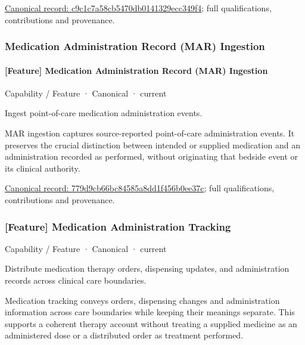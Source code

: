 {\footnotesize \href{../../../../continuum/strategy/capability/feature/c9c1c7a58cb5470db0141329ecc349f4.md}{Canonical record: c9c1c7a58cb5470db0141329ecc349f4}; full qualifications, contributions and provenance.}\par
\subsubsection{Medication Administration Record (MAR) Ingestion}

\paragraph{[Feature] Medication Administration Record (MAR) Ingestion}

\label{element:779d9cb66bc84585a8dd1f456b0ee37c}
{\small Capability / Feature · Canonical · current}\par

Ingest point-of-care medication administration events.



MAR ingestion captures source-reported point-of-care administration events. It preserves the crucial distinction between intended or supplied medication and an administration recorded as performed, without originating that bedside event or its clinical authority.


{\footnotesize \href{../../../../continuum/strategy/capability/feature/779d9cb66bc84585a8dd1f456b0ee37c.md}{Canonical record: 779d9cb66bc84585a8dd1f456b0ee37c}; full qualifications, contributions and provenance.}\par
\subsubsection{[Feature] Medication Administration Tracking}

\label{element:6e01c72ef9c149e2ac231463810c2265}
{\small Capability / Feature · Canonical · current}\par

Distribute medication therapy orders, dispensing updates, and administration records across clinical care boundaries.



Medication tracking conveys orders, dispensing changes and administration information across care boundaries while keeping their meanings separate. This supports a coherent therapy account without treating a supplied medicine as an administered dose or a distributed order as treatment performed.


